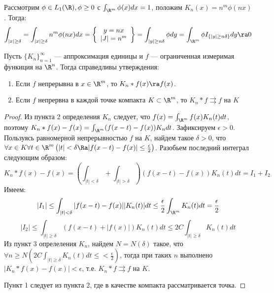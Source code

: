 \begin{example}
    Рассмотрим \(\phi \in L_1(\R), \phi \ge 0\) с \(\int_{\R^m}\phi(x)dx = 1\), положим \(K_n(x) = n^m\phi(nx)\). Тогда:
    \[\int_{|x| \ge \delta} = \int_{|x| \ge \delta} n^m\phi(nx)dx = \left\{\begin{array}{c}
        y = nx \\
        |J| = n^m
    \end{array}\right\} = \int_{|y| \ge n\delta}\phi dy = \int_{\R^m}\phi I_{\{|y| \ge n\delta\}} dy \ra 0\]
\end{example}
\begin{theorem}
    Пусть \(\{K_n\}_{n = 1}^\infty\) --- аппроксимация единицы и \(f\) --- ограниченная измеримая функиция на \(\R^n\). Тогда справедливы утверждения:
    \begin{enumerate}
        \item Если \(f\) непрерывна в \(x \in \R^m\), то \(K_n * f(x) \ra f(x)\).
        \item Если \(f\) непрервна в каждой точке компакта \(K \subset \R^m\), то \(K_n * f \rightrightarrows f\) на \(K\)
    \end{enumerate}
\end{theorem}
\begin{proof}
    Из пункта 2 определения \(K_n\) следует, что \(f(x) = \int_{\R^m} f(x)K_n(t)dt\), поэтому \(K_n * f(x) - f(x) = \int_{\R^m} (f(x - t) - f(x))K_ndt\). Зафиксируем \(\epsilon > 0\). Пользуясь равномерной непрерывностью \(f\) на \(K\), найдем такое \(\delta > 0\), что \(\forall x \in K \forall t \in \R^m \left(|t| < \delta \Ra |f(x - t) - f(x)| \le \frac{\epsilon}{2}\right)\). Разобьем последний интеграл следующим образом:
    \[K_n * f(x) - f(x) = \left( \int_{|t| < \delta} + \int_{|t| > \delta} \right)(f(x - t) - f(x))K_n(t)dt = I_1 + I_2\]
    Имеем:
    \[|I_1| \le \int_{|t| < \delta} |f(x - t) - f(x)||K_n(t)|dt \le \frac{\epsilon}{2}\int_{\R^m}K_n(t)dt = \frac{\epsilon}{2}\]
    \[|I_2| \le \int_{|t| \ge \delta} (f(x - t) + |f(x)|)K_n(t)dt \le 2C \int_{|t| \ge \delta} K_n(t)dt\]
    Из пункт 3 опрелеления \(K_n\), найдем \(N = N(\delta)\) такое, что \(\forall n \ge N \left( 2C \int_{|t| \ge \delta} K_n(t)dt \le < \frac{\epsilon}{2} \right)\), тогда при таких \(n\) выполнено \(|K_n * f(x) - f(x)| < \epsilon\), т.е. \(K_n * f \rightrightarrows f\) на \(K\).

    Пункт 1 следует из пункта 2, где в качестве компакта рассматривается точка.
\end{proof}

